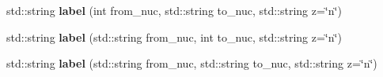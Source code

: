 \begin{Indent}
\begin{DoxyCompactItemize}
\mbox{\label{namespacepyne_1_1rxname_a2e4d7d20d4278d6b6b5b57592fab287b}} 
std\+::string {\bfseries label} (int from\+\_\+nuc, std\+::string to\+\_\+nuc, std\+::string z=\char`\"{}n\char`\"{})
\item 
\mbox{\label{namespacepyne_1_1rxname_aff83b91df8abe88197680a467b843969}} 
std\+::string {\bfseries label} (std\+::string from\+\_\+nuc, int to\+\_\+nuc, std\+::string z=\char`\"{}n\char`\"{})
\item 
\mbox{\label{namespacepyne_1_1rxname_aa316be9d06a9987cb9816cc26926a237}} 
std\+::string {\bfseries label} (std\+::string from\+\_\+nuc, std\+::string to\+\_\+nuc, std\+::string z=\char`\"{}n\char`\"{})
\end{DoxyCompactItemize}
\end{Indent}
